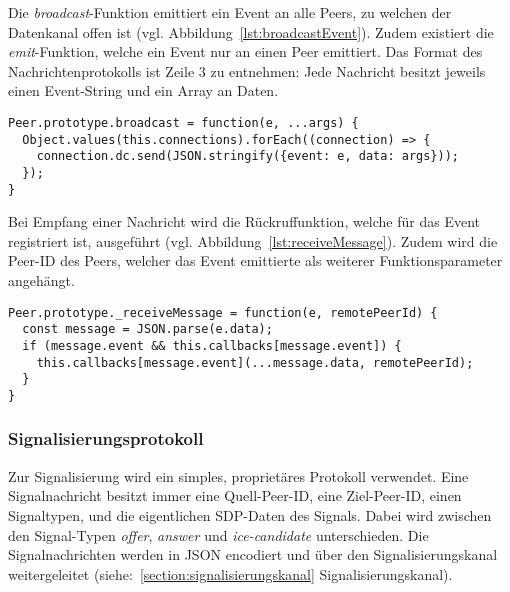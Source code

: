 Die \textit{broadcast}-Funktion emittiert ein Event an alle Peers, zu welchen der Datenkanal offen ist (vgl. Abbildung~\ref{lst:broadcastEvent}). Zudem existiert die \textit{emit}-Funktion, welche ein Event nur an einen Peer emittiert. Das Format des Nachrichtenprotokolls ist Zeile 3 zu entnehmen: Jede Nachricht besitzt jeweils einen Event-String und ein Array an Daten.\par

\vspace{5pt}
\lstset{language=js, style=STYLE_CODE_JS}
\begin{singlespace}
\begin{lstlisting}[caption={Funktion zum Emittieren eines Events -- Peer.js}, captionpos=b, label={lst:broadcastEvent}]
Peer.prototype.broadcast = function(e, ...args) {
  Object.values(this.connections).forEach((connection) => {
    connection.dc.send(JSON.stringify({event: e, data: args}));
  });
}
\end{lstlisting}
\end{singlespace}

Bei Empfang einer Nachricht wird die Rückruffunktion, welche für das Event registriert ist, ausgeführt (vgl. Abbildung~\ref{lst:receiveMessage}). Zudem wird die Peer-ID des Peers, welcher das Event emittierte als weiterer Funktionsparameter angehängt.\par

\vspace{5pt}
\lstset{language=js, style=STYLE_CODE_JS}
\begin{singlespace}
\begin{lstlisting}[caption={Funktion bei Erhalt einer Nachricht -- Peer.js}, captionpos=b, label={lst:receiveMessage}]
Peer.prototype._receiveMessage = function(e, remotePeerId) {
  const message = JSON.parse(e.data);
  if (message.event && this.callbacks[message.event]) {
    this.callbacks[message.event](...message.data, remotePeerId);
  }
}
\end{lstlisting}
\end{singlespace}

\subsubsection{Signalisierungsprotokoll}
Zur Signalisierung wird ein simples, proprietäres Protokoll verwendet. Eine Signalnachricht besitzt immer eine Quell-Peer-ID, eine Ziel-Peer-ID, einen Signaltypen, und die eigentlichen \acs{SDP}-Daten des Signals. Dabei wird zwischen den Signal-Typen \textit{offer}, \textit{answer} und \textit{ice-candidate} unterschieden. Die Signalnachrichten werden in \acf{JSON} encodiert und über den Signalisierungskanal weitergeleitet (siehe:~\ref{section:signalisierungskanal} Signalisierungskanal).\par

